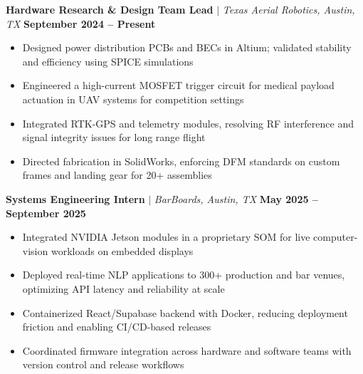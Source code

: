 \documentclass[10pt, letterpaper]{article}
\newcommand{\worksubsection}[3]{%
  \noindent\textbf{#1} $|$ \textit{#2} \hfill \textbf{#3}%
}
\begin{document}
\vspace{4pt}
\worksubsection{Hardware Research \& Design Team Lead}{Texas Aerial Robotics, Austin, TX}{September 2024 -- Present}
\begin{itemize}[leftmargin=0.1in, noitemsep, topsep=0pt, itemsep=1pt, parsep=0pt]
    \item Designed power distribution PCBs and BECs in Altium; validated stability and efficiency using SPICE simulations
    \item Engineered a high-current MOSFET trigger circuit for medical payload actuation in UAV systems for competition settings
    \item Integrated RTK-GPS and telemetry modules, resolving RF interference and signal integrity issues for long range flight
    \item Directed fabrication in SolidWorks, enforcing DFM standards on custom frames and landing gear for 20+ assemblies
\end{itemize}

\vspace{4pt}
\worksubsection{Systems Engineering Intern}{BarBoards, Austin, TX}{May 2025 -- September 2025}
\begin{itemize}[leftmargin=0.1in, noitemsep, topsep=0pt, itemsep=1pt, parsep=0pt]
    \item Integrated NVIDIA Jetson modules in a proprietary SOM for live computer-vision workloads on embedded displays
    \item Deployed real-time NLP applications to 300+ production and bar venues, optimizing API latency and reliability at scale
    \item Containerized React/Supabase backend with Docker, reducing deployment friction and enabling CI/CD-based releases
    \item Coordinated firmware integration across hardware and software teams with version control and release workflows
\end{itemize}

\end{document}

